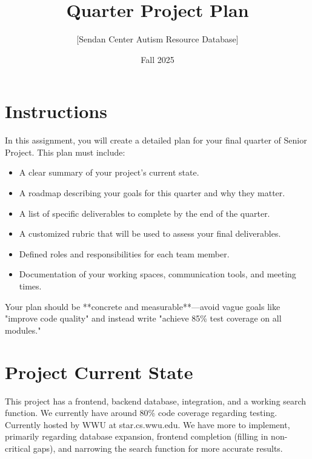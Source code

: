 \documentclass{article}
\title{Quarter Project Plan}
\author{[Sendan Center Autism Resource Database]}
\date{Fall 2025}
\begin{document}
\maketitle

\section*{Instructions}
In this assignment, you will create a detailed plan for your final quarter of Senior Project.  
This plan must include:  
\begin{itemize}
    \item A clear summary of your project’s current state.  
    \item A roadmap describing your goals for this quarter and why they matter.  
    \item A list of specific deliverables to complete by the end of the quarter.  
    \item A customized rubric that will be used to assess your final deliverables.  
    \item Defined roles and responsibilities for each team member.  
    \item Documentation of your working spaces, communication tools, and meeting times.  
\end{itemize}

Your plan should be **concrete and measurable**—avoid vague goals like "improve code quality" and instead write "achieve 85\% test coverage on all modules."  

\section*{Project Current State}
This project has a frontend, backend database, integration, and a working search function. We currently have around 80\% code coverage regarding testing. Currently hosted by WWU at star.cs.wwu.edu. We have more to implement, primarily regarding database expansion, frontend completion (filling in non-critical gaps), and narrowing the search function for more accurate results.
\end{document}
